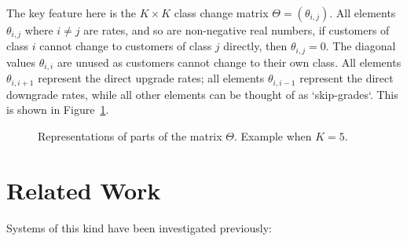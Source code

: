 \documentclass{article}
\begin{document}
The key feature here is the $K \times K$ class change matrix
$\Theta = (\theta_{i,j})$. All elements $\theta_{i,j}$ where $i \neq j$ are
rates, and so are non-negative real numbers, if customers of class $i$ cannot
change to customers of class $j$ directly, then $\theta_{i,j} = 0$. The diagonal
values $\theta_{i,i}$ are unused as customers cannot change to their own class.
All elements $\theta_{i,i+1}$ represent the direct upgrade rates; all elements
$\theta_{i,i-1}$ represent the direct downgrade rates, while all other elements
can be thought of as `skip-grades`.
This is shown in Figure~\ref{fig:skipgrades}.

\begin{figure}
\begin{center}

\end{center}
\caption{Representations of parts of the matrix $\Theta$. Example when $K=5$.}
\label{fig:skipgrades}
\end{figure}




\section{Related Work}\label{sec:related}
Systems of this kind have been investigated previously:
\end{document}
